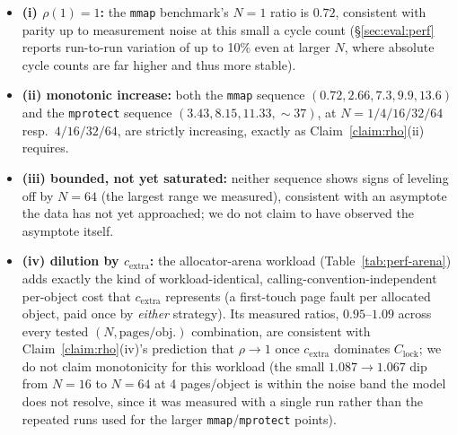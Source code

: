 \documentclass[10pt]{article}
\newcommand{\vfn}[1]{\texttt{#1}}
\begin{document}
\begin{itemize}
  \item \textbf{(i) $\rho(1)=1$:} the \vfn{mmap} benchmark's $N{=}1$
    ratio is $0.72$, consistent with parity up to measurement noise at
    this small a cycle count (\S\ref{sec:eval:perf} reports run-to-run
    variation of up to 10\% even at larger $N$, where absolute cycle
    counts are far higher and thus more stable).
  \item \textbf{(ii) monotonic increase:} both the \vfn{mmap} sequence
    $(0.72, 2.66, 7.3, 9.9, 13.6)$ and the \vfn{mprotect} sequence
    $(3.43, 8.15, 11.33, {\sim}37)$, at $N = 1/4/16/32/64$ resp.\
    $4/16/32/64$, are strictly increasing, exactly as
    Claim~\ref{claim:rho}(ii) requires.
  \item \textbf{(iii) bounded, not yet saturated:} neither sequence
    shows signs of leveling off by $N{=}64$ (the largest range we
    measured), consistent with an asymptote the data has not yet
    approached; we do not claim to have observed the asymptote itself.
  \item \textbf{(iv) dilution by $c_{\mathrm{extra}}$:} the
    allocator-arena workload (Table~\ref{tab:perf-arena}) adds exactly
    the kind of workload-identical, calling-convention-independent
    per-object cost that $c_{\mathrm{extra}}$ represents (a first-touch
    page fault per allocated object, paid once by \emph{either}
    strategy). Its measured ratios, $0.95$--$1.09$ across every tested
    $(N, \text{pages/obj.})$ combination, are consistent with
    Claim~\ref{claim:rho}(iv)'s prediction that $\rho \to 1$ once
    $c_{\mathrm{extra}}$ dominates $C_{\mathrm{lock}}$; we do not claim
    monotonicity for this workload (the small $1.087 \to 1.067$ dip
    from $N{=}16$ to $N{=}64$ at 4 pages/object is within the noise
    band the model does not resolve, since it was measured with a
    single run rather than the repeated runs used for the larger
    \vfn{mmap}/\vfn{mprotect} points).
\end{itemize}
\end{document}
